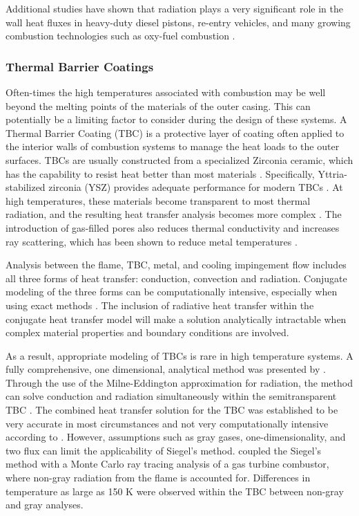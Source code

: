 Additional studies have shown that radiation plays a very significant role in the wall heat fluxes in heavy-duty diesel pistons, re-entry vehicles, and many growing combustion technologies such as oxy-fuel combustion \cite{Modest2016RadiativeSystems}.


\subsubsection{Thermal Barrier Coatings}
Often-times the high temperatures associated with combustion may be well beyond the melting points of the materials of the outer casing. This can potentially be a limiting factor to consider during the design of these systems.
A Thermal Barrier Coating (TBC) is a protective layer of coating often applied to the interior walls of combustion systems to manage the heat loads to the outer surfaces. 
TBCs are usually constructed from a specialized Zirconia ceramic, which has the capability to resist heat
better than most materials \cite{Miller1997ThermalDirections}. Specifically, Yttria-stabilized zirconia (YSZ) provides adequate performance for modern TBCs \cite{Padture2002ThermalApplications}. At high temperatures, these materials become transparent to most thermal radiation, and the resulting heat transfer analysis becomes more complex \cite{Howell2010ThermalTransfer, Siegel1998AnalysisCoatings}. The
introduction of gas-filled pores also reduces thermal conductivity and increases ray scattering, which has been shown to reduce metal temperatures \cite{Boissonnet2019EvolutionTemperature,Spuckler1996Two-FluxLayers}.

Analysis between the flame, TBC, metal, and cooling impingement flow includes all three forms of heat
transfer: conduction, convection and radiation. Conjugate modeling of the three forms can be computationally intensive, especially when using exact methods \cite{Viskanta1975HeatSolids}. 
The inclusion of radiative heat transfer within the conjugate heat transfer model will make a solution analytically intractable when complex material properties and boundary conditions are involved.

As a result, appropriate modeling of TBCs is rare in high temperature systems. A fully comprehensive, one dimensional, analytical method was presented by \citet{Siegel1996InternalCoatings}. Through the use of the Milne-Eddington approximation for radiation, the method can solve conduction and radiation simultaneously
within the semitransparent TBC \cite{Milne1930ThermodynamicsStars,Eddington1920TheStars}. The combined heat transfer solution for the TBC was established to be very accurate in most circumstances and not very computationally intensive according to \citet{Siegel1996InternalCoatings}. 
However, assumptions such as gray gases, one-dimensionality, and two flux can limit the applicability of Siegel’s method. \citet{Johnson2021AnalysisMethod} coupled the Siegel’s method with a Monte Carlo ray tracing analysis of a gas turbine combustor, where non-gray radiation from the flame is accounted for. Differences in temperature as large as 150 K were observed within the TBC between non-gray and gray analyses.

